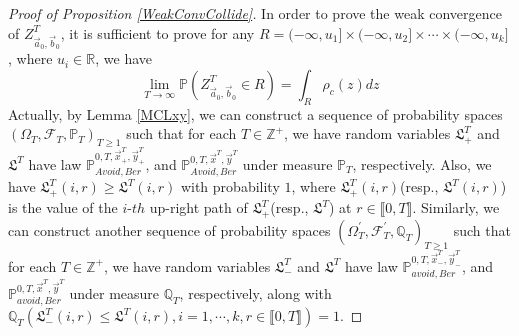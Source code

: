 \begin{proof}[Proof of Proposition \ref{WeakConvCollide}]
In order to prove the weak convergence of $Z^{T}_{\vec{a}_{0},\vec{b}_{0}}$, it is sufficient to prove for any $R=(-\infty,u_{1}]\times(-\infty,u_{2}]\times\cdots\times(-\infty,u_{k}]$, where $u_{i}\in\mathbb{R}$, we have 
\begin{equation}
	\lim_{T\rightarrow\infty}\mathbb{P}(Z^{T}_{\vec{a}_{0},\vec{b}_{0}}\in R)=\int_{R}\rho_{c}(z)dz
\end{equation}
Actually, by Lemma \ref{MCLxy}, we can construct a sequence of probability spaces $(\Omega_{T},\mathcal{F}_{T},\mathbb{P}_{T})_{T\geq 1}$ such that for each $T\in\mathbb{Z}^{+}$, we have random variables $\mathfrak{L}_{+}^{T}$ and $\mathfrak{L}^{T}$ have law $\mathbb{P}_{Avoid,Ber}^{0,T,\vec{x}^{T}_{+},\vec{y}^{T}_{+}}$, and $\mathbb{P}_{Avoid,Ber}^{0,T,\vec{x}^{T},\vec{y}^{T}}$ under measure $\mathbb{P}_{T}$, respectively. Also, we have $\mathfrak{L}_{+}^{T}(i,r)\geq \mathfrak{L}^{T}(i,r)$ with probability $1$, where $\mathfrak{L}_{+}^{T}(i,r)$(resp., $\mathfrak{L}^{T}(i,r)$) is the value of the $i$-$th$ up-right path of $\mathfrak{L}_{+}^{T}$(resp., $\mathfrak{L}^{T}$) at $r\in\llbracket 0,T\rrbracket$. Similarly, we can construct another sequence of probability spaces $(\Omega_{T}^{\prime},\mathcal{F}_{T}^{\prime},\mathbb{Q}_{T})_{T\geq 1}$ such that for each $T\in\mathbb{Z}^{+}$, we have random variables $\mathfrak{L}_{-}^{T}$ and $\mathfrak{L}^{T}$ have law $\mathbb{P}_{avoid,Ber}^{0,T,\vec{x}^{T}_{-},\vec{y}^{T}_{-}}$, and $\mathbb{P}_{avoid,Ber}^{0,T,\vec{x}^{T},\vec{y}^{T}}$ under measure $\mathbb{Q}_{T}$, respectively, along with $\mathbb{Q}_{T}\left(\mathfrak{L}_{-}^{T}(i,r)\leq \mathfrak{L}^{T}(i,r), i=1,\cdots, k, r\in\llbracket 0,T\rrbracket\right)=1$.


\end{proof}
